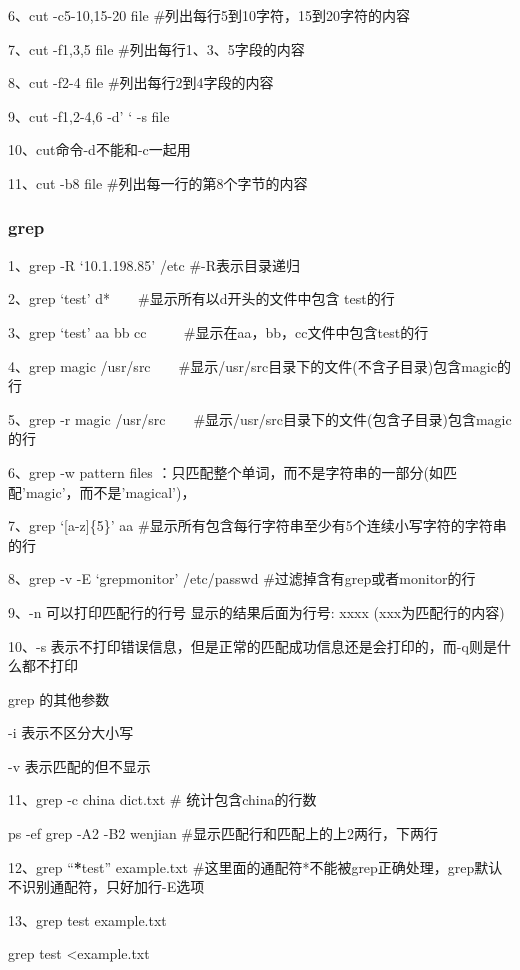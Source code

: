 \documentclass[letterpaper,10pt]{sphinxmanual}
\begin{document}
6、cut -c5-10,15-20 file \#列出每行5到10字符，15到20字符的内容

7、cut -f1,3,5 file  \#列出每行1、3、5字段的内容

8、cut -f2-4 file  \#列出每行2到4字段的内容

9、cut -f1,2-4,6 -d' ` -s file

10、cut命令-d不能和-c一起用

11、cut -b8 file  \#列出每一行的第8个字节的内容


\subsubsection{grep}
\label{Linux_find/content:grep}
1、grep -R `10.1.198.85' /etc \#-R表示目录递归

2、grep `test' d*　　\#显示所有以d开头的文件中包含 test的行

3、grep ‘test’ aa bb cc 　　 \#显示在aa，bb，cc文件中包含test的行

4、grep magic /usr/src　　\#显示/usr/src目录下的文件(不含子目录)包含magic的行

5、grep -r magic /usr/src　　\#显示/usr/src目录下的文件(包含子目录)包含magic的行

6、grep -w pattern files ：只匹配整个单词，而不是字符串的一部分(如匹配’magic’，而不是’magical’)，

7、grep ‘{[}a-z{]}\{5\}’ aa \#显示所有包含每行字符串至少有5个连续小写字符的字符串的行

8、grep -v -E `grep\textbar{}monitor' /etc/passwd \#过滤掉含有grep或者monitor的行

9、-n 可以打印匹配行的行号 显示的结果后面为行号: xxxx (xxx为匹配行的内容)

10、-s 表示不打印错误信息，但是正常的匹配成功信息还是会打印的，而-q则是什么都不打印

grep 的其他参数

-i 表示不区分大小写

-v 表示匹配的但不显示

11、grep -c china  dict.txt  \# 统计包含china的行数

ps -ef {\color{red}\bfseries{}\textbar{}}grep -A2 -B2 wenjian \#显示匹配行和匹配上的上2两行，下两行

12、grep ``{\color{red}\bfseries{}*}test''  example.txt \#这里面的通配符*不能被grep正确处理，grep默认不识别通配符，只好加行-E选项

13、grep test example.txt

grep test \textless{}example.txt
\end{document}
